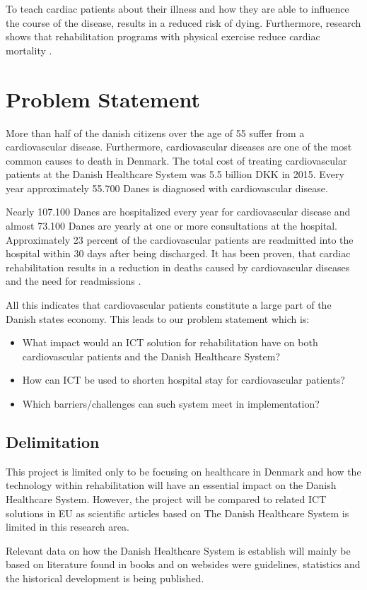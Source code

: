 To teach cardiac patients about their illness and how they are able to influence the course of the disease, results in a reduced risk of dying. Furthermore, research shows that rehabilitation programs with physical exercise reduce cardiac mortality \cite{Hjerteforening}.    
   


\section{Problem Statement}
More than half of the danish citizens over the age of 55 suffer from a cardiovascular disease. Furthermore, cardiovascular diseases are one of the most common causes to death in Denmark. The total cost of treating cardiovascular patients at the Danish Healthcare System was 5.5 billion DKK in 2015. Every year approximately 55.700 Danes is diagnosed with cardiovascular disease.   

Nearly 107.100 Danes are hospitalized every year for cardiovascular disease and almost 73.100 Danes are yearly at one or more consultations at the hospital. Approximately 23 percent of the cardiovascular patients are readmitted into the hospital within 30 days after being discharged. It has been proven, that cardiac rehabilitation results in a reduction in deaths caused by cardiovascular diseases and the need for readmissions \cite{Hjerteforening}.

All this indicates that cardiovascular patients constitute a large part of the Danish states economy. This leads to our problem statement which is:

\begin{itemize}
	\item What impact would an ICT solution for rehabilitation have on both cardiovascular patients and the Danish Healthcare System?
	\item How can ICT be used to shorten hospital stay for cardiovascular patients?
	\item Which barriers/challenges can such system meet in implementation?
\end{itemize}

\subsection{Delimitation}
This project is limited only to be focusing on healthcare in Denmark and how the technology within rehabilitation will have an essential impact on the Danish Healthcare System. However, the project will be compared to related ICT solutions in EU as scientific articles based on The Danish Healthcare System is limited in this research area. 

Relevant data on how the Danish Healthcare System is establish will mainly be based on literature found in books and on websides were guidelines, statistics and the historical development is being published. 


